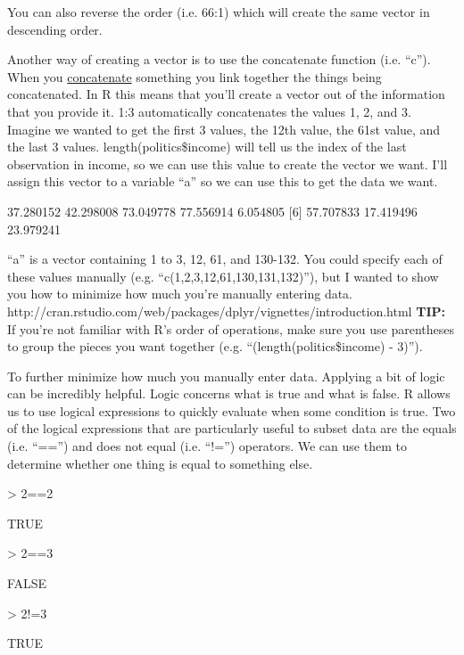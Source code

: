\documentclass[12pt]{article}
\begin{document}
You can also reverse the order (i.e. 66:1) which will create the same vector in
descending order.

Another way of creating a vector is to use the concatenate function (i.e. ``c'').
When you \href{http://www.merriam-webster.com/dictionary/concatenate}{concatenate}
something you link together the things being concatenated. In R this means that
you'll create a vector out of the information that you provide it. 1:3 automatically
concatenates the values 1, 2, and 3. Imagine we wanted to get the first 3 values,
the 12th value, the 61st value, and the last 3 values. length(politics\$income) will
tell us the index of the last observation in income, so we can use this value to
create the vector we want. I'll assign this vector to a variable ``a'' so we
can use this to get the data we want.

\begin{Schunk}
\begin{Soutput}
[1] 37.280152 42.298008 73.049778 77.556914  6.054805
[6] 57.707833 17.419496 23.979241
\end{Soutput}
\end{Schunk}

``a'' is a vector containing 1 to 3, 12, 61, and 130-132. You could
specify each of these values manually (e.g. ``c(1,2,3,12,61,130,131,132)''), but
I wanted to show you how to minimize how much you're manually entering data.
http://cran.rstudio.com/web/packages/dplyr/vignettes/introduction.html
\textbf{TIP:} If you're not familiar with R's order of operations, make sure you use parentheses
to group the pieces you want together (e.g. ``(length(politics\$income) - 3)'').

To further minimize how much you manually enter data. Applying a bit of logic
can be incredibly helpful. Logic concerns what is true and what is false. R allows
us to use logical expressions to quickly evaluate when some condition is true.
Two of the logical expressions that are particularly useful to subset data are the
equals (i.e. ``=='') and does not equal (i.e. ``!='') operators. We can use them to
determine whether one thing is equal to something else.

\begin{Schunk}
\begin{Sinput}
> 2==2
\end{Sinput}
\begin{Soutput}
[1] TRUE
\end{Soutput}
\begin{Sinput}
> 2==3
\end{Sinput}
\begin{Soutput}
[1] FALSE
\end{Soutput}
\begin{Sinput}
> 2!=3
\end{Sinput}
\begin{Soutput}
[1] TRUE
\end{Soutput}
\end{Schunk}
\end{document}
